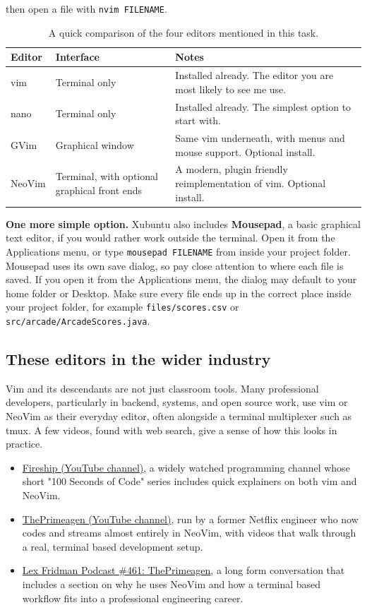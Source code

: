 \documentclass[11pt]{article}
\renewenvironment{accessibletable}[3]{%
  \begin{table}[H]
  \centering
  \caption{#1}
  \label{#2}
  \begin{tabular}{#3}
}{%
  \end{tabular}
  \end{table}
}
\begin{document}
\noindent then open a file with \texttt{nvim FILENAME}.

\begin{accessibletable}{A quick comparison of the four editors mentioned in this task.}{tab:editors}{p{2.4cm}p{3.4cm}p{7.8cm}}
\toprule
\textbf{Editor} & \textbf{Interface} & \textbf{Notes} \\
\midrule
vim & Terminal only & Installed already. The editor you are most likely to see me use. \\
nano & Terminal only & Installed already. The simplest option to start with. \\
GVim & Graphical window & Same vim underneath, with menus and mouse support. Optional install. \\
NeoVim & Terminal, with optional graphical front ends & A modern, plugin friendly reimplementation of vim. Optional install. \\
\bottomrule
\end{accessibletable}

\noindent\textbf{\color{coaNavy}One more simple option.} Xubuntu also
includes \textbf{Mousepad}, a basic graphical text editor, if you would rather
work outside the terminal. Open it from the Applications menu, or type
\texttt{mousepad FILENAME} from inside your project folder. Mousepad uses its
own save dialog, so pay close attention to where each file is saved. If you
open it from the Applications menu, the dialog may default to your home
folder or Desktop. Make sure every file ends up in the correct place inside
your project folder, for example \texttt{files/scores.csv} or
\texttt{src/arcade/ArcadeScores.java}.

\subsection{These editors in the wider industry}

Vim and its descendants are not just classroom tools. Many professional
developers, particularly in backend, systems, and open source work, use vim
or NeoVim as their everyday editor, often alongside a terminal multiplexer
such as tmux. A few videos, found with web search, give a sense of how this
looks in practice.

\begin{itemize}
  \item \href{https://www.youtube.com/@Fireship}{Fireship (YouTube
    channel)}, a widely watched programming channel whose short "100 Seconds
    of Code" series includes quick explainers on both vim and NeoVim.
  \item \href{https://youtube.com/ThePrimeagen}{ThePrimeagen (YouTube
    channel)}, run by a former Netflix engineer who now codes and streams
    almost entirely in NeoVim, with videos that walk through a real,
    terminal based development setup.
  \item \href{https://www.youtube.com/watch?v=tNZnLkRBYA8}{Lex Fridman
    Podcast \#461: ThePrimeagen}, a long form conversation that includes a
    section on why he uses NeoVim and how a terminal based workflow fits
    into a professional engineering career.
\end{itemize}
\end{document}
